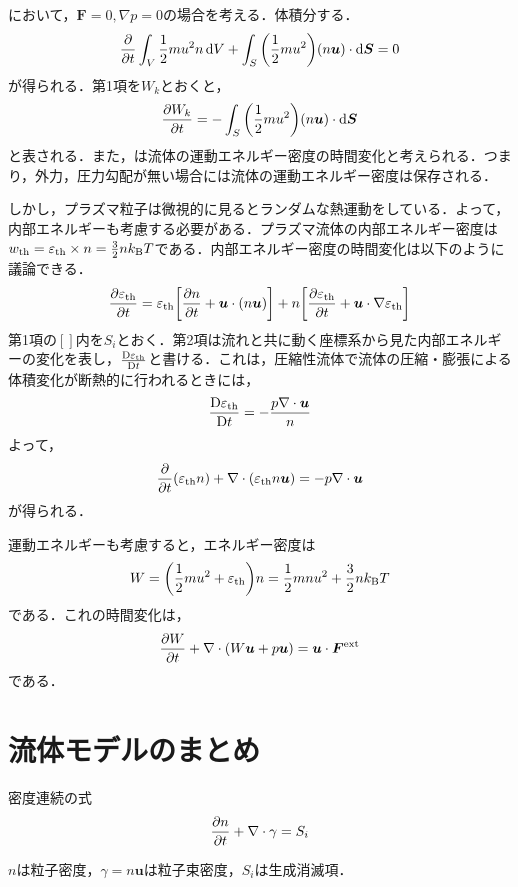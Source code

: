 \documentclass{report}
\begin{document}
  において，$\bm{F} = 0,\nabla p = 0$の場合を考える．体積分する．
  \begin{align}
    \pdv{t} \int_V \frac{1}{2} mu^2 n \dd{V} + \int_S \qty(\frac{1}{2} mu^2)(n\bm{u}) \cdot \dd{\bm{S}} = 0
  \end{align}
  が得られる．第1項を$W_k$とおくと，
  \begin{align}
    \pdv{W_k}{t} = -\int_S \qty(\frac{1}{2} mu^2)(n\bm{u}) \cdot \dd{\bm{S}}
  \end{align}
  と表される．また，は流体の運動エネルギー密度の時間変化と考えられる．つまり，外力，圧力勾配が無い場合には流体の運動エネルギー密度は保存される．

  しかし，プラズマ粒子は微視的に見るとランダムな熱運動をしている．よって，内部エネルギーも考慮する必要がある．プラズマ流体の内部エネルギー密度は
  $w_{\mathrm{th}} = \varepsilon_{\mathrm{th}} \times n = \frac{3}{2} nk_{\mathrm{B}} T$である．内部エネルギー密度の時間変化は以下のように議論できる．
  \begin{align}
    \pdv{\varepsilon_{\mathrm{th}}}{t} = \varepsilon_{\mathrm{th}} \qty[\pdv{n}{t} + \bm{u} \cdot (n\bm{u})] + n \qty[\pdv{\varepsilon_{\mathrm{th}}}{t} + \bm{u} \cdot \nabla \varepsilon_{\mathrm{th}}]
  \end{align}
  第1項の$[]$内を$S_i$とおく．第2項は流れと共に動く座標系から見た内部エネルギーの変化を表し，$\frac{\mathrm{D}\varepsilon_{\mathrm{th}}}{\mathrm{D}t}$と書ける．これは，圧縮性流体で流体の圧縮・膨張による体積変化が断熱的に行われるときには，
  \begin{align}
    \frac{\mathrm{D}\varepsilon_{\mathrm{th}}}{\mathrm{D}t} = - \frac{p \nabla \cdot \bm{u}}{n}
  \end{align}
  よって，
  \begin{align}
    \pdv{t} (\varepsilon_{\mathrm{th}} n) + \nabla \cdot (\varepsilon_{\mathrm{th}} n \bm{u}) = -p \nabla \cdot \bm{u} \label{eq:internal_energy}
  \end{align}
  が得られる．

  運動エネルギーも考慮すると，エネルギー密度は
  \begin{align}
    W = \qty(\frac{1}{2} mu^2 + \varepsilon_{\mathrm{th}})n = \frac{1}{2} mn u^2 + \frac{3}{2} n k_{\mathrm{B}} T
  \end{align}
  である．これの時間変化は，
  \begin{align}
    \pdv{W}{t} + \nabla \cdot (W \bm{u} + p \bm{u}) = \bm{u} \cdot \bm{F}^{\mathrm{ext}}
  \end{align}
  である．

\section{流体モデルのまとめ}
  \begin{itembox}[l]{密度連続の式}
    \begin{align}
      \pdv{n}{t} + \nabla \cdot \gamma = S_i
    \end{align}
  \end{itembox}
  $n$は粒子密度，$\gamma = n\bm{u}$は粒子束密度，$S_i$は生成消滅項．
\end{document}
